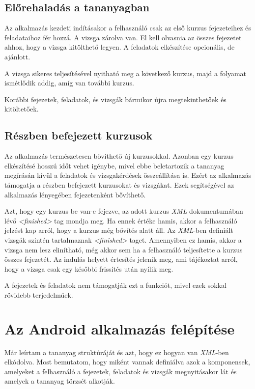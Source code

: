 \documentclass[12pt,a4paper]{article}
\newcommand{\xml}{\textit{XML}\xspace}
\begin{document}
	\subsection{Előrehaladás a tananyagban}
	
	Az alkalmazás kezdeti indításakor a felhasználó csak az első kurzus fejezeteihez és feladataihoz fér hozzá. A vizsga zárolva van. El kell olvasnia az összes fejezetet ahhoz, hogy a vizsga kitölthető legyen. A feladatok elkészítése opcionális, de ajánlott.
	
	A vizsga sikeres teljesítésével nyitható meg a következő kurzus, majd a folyamat ismétlődik addig, amíg van további kurzus.
	
	Korábbi fejezetek, feladatok, és vizsgák bármikor újra megtekinthetőek és kitöltetőek. 
	
	\subsection{Részben befejezett kurzusok}\label{reszben_befejezett_kurzusok}
	
	Az alkalmazás természetesen bővíthető új kurzusokkal. Azonban egy kurzus elkészítésé hosszú időt vehet igénybe, mivel ebbe beletartozik a tananyag megírásán kívül a feladatok és vizsgakérdések összeállítása is. Ezért az alkalmazás támogatja a részben befejezett kurzusokat és vizsgákat. Ezek segítségével az alkalmazás lényegében fejezetenként bővíthető.
	
	Azt, hogy egy kurzus be van-e fejezve, az adott kurzus \xml dokumentumában lévő \textit{<finished>} tag mondja meg. Ha ennek értéke hamis, akkor a felhasználó jelzést kap arról, hogy a kurzus még bővítés alatt áll. Az \xml-ben definiált vizsgák szintén tartalmaznak  \textit{<finished>} taget. Amennyiben ez hamis, akkor a vizsga nem lesz elinítható, még akkor sem ha a felhasználó teljesítette a kurzus összes fejezetét. Az indulás helyett értesítés jelenik meg, ami tájékoztat arról, hogy a vizsga csak egy későbbi frissítés után nyílik meg.
	
	A fejezetek és feladatok nem támogatják ezt a funkciót, mivel ezek sokkal rövidebb terjedelműek.
	
	\section{Az Android alkalmazás felépítése}\label{android_alk_felepites}
	
	Már leírtam a tananyag struktúráját és azt, hogy ez hogyan van \xml-ben elkódolva. Most bemutatom, hogy miként vannak definiálva azok a komponensek, amelyeket a felhasználó a fejezetek, feladatok és vizsgák megnyitásakor lát és amelyek a tananyag törzsét alkotják.
	
\end{document}
